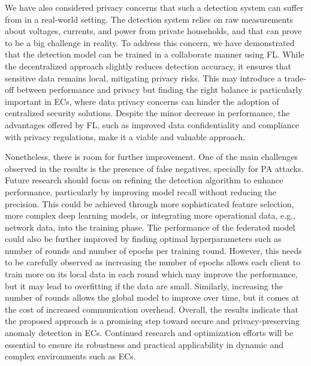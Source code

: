 We have also considered privacy concerns that such a detection system can suffer from in a real-world  setting. The detection system relies on raw measurements about voltages, currents, and power from private households, and that can prove to be a big challenge in reality. To address this concern, we have demonstrated that the detection model can be trained in a collaborate manner using FL. While the decentralized approach slightly reduces detection accuracy, it ensures that sensitive data remains local, mitigating privacy risks. This may introduce a trade-off between performance and privacy but finding the right balance is particularly important in ECs, where data privacy concerns can hinder the adoption of centralized security solutions. Despite the minor decrease in performance, the advantages offered by FL, such as improved data confidentiality and compliance with privacy regulations, make it a viable and valuable approach. 

Nonetheless, there is room for further improvement. One of the main challenges observed in the results is the presence of false negatives, specially for PA attacks. Future research should focus on refining the detection algorithm to enhance performance, particularly by improving model recall without reducing the precision. This could be achieved through more sophisticated feature selection, more complex deep learning models, or integrating more operational data, e.g., network data, into the training phase. The performance of the federated model could also be further improved by finding optimal hyperparameters such as number of rounds and number of epochs per training round. However, this needs to be carefully observed as increasing the number of epochs allows each client to train more on its local data in each round which may improve the performance, but it may lead to overfitting if the data are small. Similarly, increasing the number of rounds allows the global model to improve over time, but it comes at the cost of increased communication overhead. Overall, the results indicate that the proposed approach is a promising step toward secure and privacy-preserving anomaly detection in ECs. Continued research and optimization efforts will be essential to ensure its robustness and practical applicability in dynamic and complex environments such as ECs.
 







